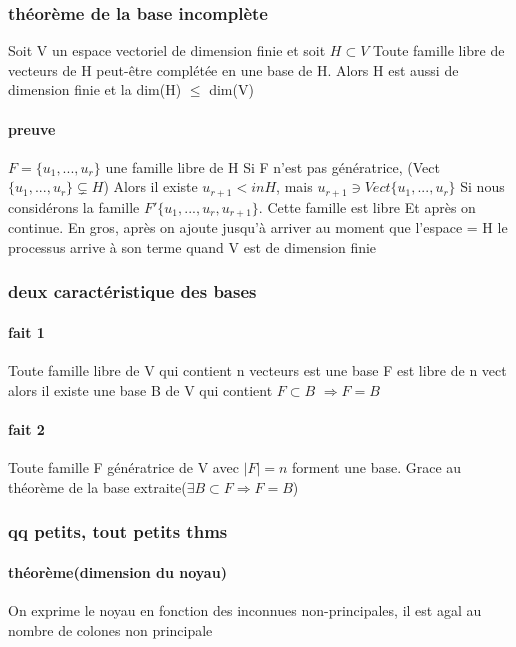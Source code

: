 \documentclass[a4paper,10pt]{article}
\begin{document}
\subsubsection{théorème de la base incomplète}
Soit V un espace vectoriel de dimension finie et soit $H\subset V$ 
\newline
Toute famille libre de vecteurs de H peut-être complétée en une base de H.
\newline
Alors H est aussi de dimension finie et la dim(H) $\leq$ dim(V)
\paragraph{preuve}
$F=\{u_1,...,u_r\}$ une famille libre de H
\newline
Si F n'est pas génératrice, (Vect$ \{u_1,...,u_r\}\varsubsetneq H$)
\newline
Alors il existe $u_{r+1}<in H$, mais $u_{r+1}\ni Vect\{u_1,...,u_r\}$
\newline
Si nous considérons la famille $F'\{u_1,...,u_r,u_{r+1}\}$. Cette famille est libre
\newline
Et après on continue. En gros, après on ajoute jusqu'à arriver au moment que l'espace = H
\newline
le processus arrive à son terme quand V est de dimension finie
\subsubsection{deux caractéristique des bases}
\paragraph{fait 1}
Toute famille libre de V qui contient n vecteurs est une base
\newline
F est libre de n vect alors il existe une base B de V qui contient $F\subset B $ $\Rightarrow F=B$
\paragraph{fait 2}
Toute famille F génératrice de V avec $|F|=n$ forment une base. Grace au théorème de la base extraite($\exists B\subset F\Rightarrow F=B$)
\subsubsection{qq petits, tout petits thms}
\paragraph{théorème(dimension du noyau)}
On exprime le noyau en fonction des inconnues non-principales, il est agal au nombre de colones non principale
\end{document}
